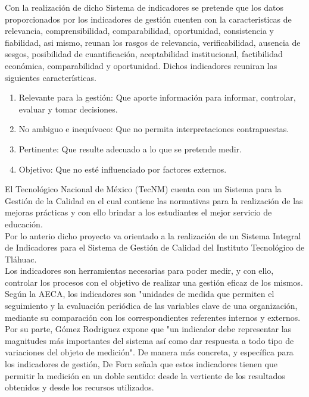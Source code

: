 	Con la realizaci\'on de dicho Sistema de indicadores se pretende que los datos proporcionados por los indicadores de gesti\'on cuenten con la caracteristicas de relevancia, comprensibilidad, comparabilidad, oportunidad, consistencia y fiabilidad, asi mismo, reunan los rasgos de relevancia, verificabilidad, ausencia de sesgos, posibilidad de cuantificaci\'on, aceptabilidad institucional, factibilidad econ\'omica, comparabilidad y oportunidad. Dichos indicadores reuniran las siguientes caracter\'isticas.\\

	\begin{enumerate}
		\item  Relevante para la gesti\'on: Que aporte informaci\'on para informar, controlar, evaluar y tomar decisiones.
		\item  No ambiguo e inequ\'ivoco: Que no permita interpretaciones contrapuestas.
		\item  Pertinente: Que resulte adecuado a lo que se pretende medir.
		\item  Objetivo: Que no est\'e influenciado por factores externos.
	\end{enumerate}

	El Tecnol\'ogico Nacional de M\'exico (TecNM) cuenta con un Sistema para  la Gesti\'on de la Calidad en el cual contiene las normativas para la realizaci\'on de las mejoras pr\'acticas y con ello brindar a los estudiantes el mejor servicio de educaci\'on.\\

	Por lo anterio dicho proyecto va orientado a la realizaci\'on de un Sistema Integral de Indicadores para el Sistema de Gesti\'on de Calidad del Instituto Tecnol\'ogico de Tl\'ahuac.\\

	Los indicadores son herramientas necesarias para poder medir, y con ello, controlar los procesos con el objetivo de realizar una gesti\'on eficaz de los mismos.\\

	Seg\'un la AECA, los indicadores son "unidades de medida que permiten el seguimiento y la evaluaci\'on peri\'odica de las variables clave de una organizaci\'on, mediante su comparaci\'on con los correspondientes referentes internos y externos. Por su parte, G\'omez Rodriguez expone que "un indicador debe representar las magnitudes m\'as importantes del sistema as\'i como dar respuesta a todo tipo de variaciones del objeto de medici\'on". De manera m\'as concreta, y espec\'ifica para los indicadores de gesti\'on, De Forn se\~nala que estos indicadores tienen que permitir la medici\'on en un doble sentido: desde la vertiente de los resultados obtenidos y desde los recursos utilizados.\\

